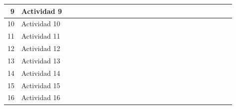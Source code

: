 \documentclass[10pt,letterpaper]{report}
\begin{document}
\begin{landscape}
\begin{table}[htbp]
{\begin{tabular}{|r|l|r|r|r|r|r|r|r|r|r|r|r|r|r|r|r|r|r|r|r|r|r|r|r|r|}
			\midrule
			9     & Actividad 9 &       &       &       &       &       &       &       &       &       &       &       &       &       &       &       &       &       &       &       &       &       &       &       &  \\
			\midrule
			10    & Actividad 10 &       &       &       &       &       & \cellcolor[rgb]{ .557,  .663,  .859} & \cellcolor[rgb]{ .557,  .663,  .859} & \cellcolor[rgb]{ .557,  .663,  .859} & \cellcolor[rgb]{ .557,  .663,  .859} &       &       &       &       &       &       &       &       &       &       &       &       &       &       &  \\
			\midrule
			11    & Actividad 11 &       &       &       &       &       &       &       &       &       &       & \cellcolor[rgb]{ .557,  .663,  .859} & \cellcolor[rgb]{ .557,  .663,  .859} & \cellcolor[rgb]{ .557,  .663,  .859} & \cellcolor[rgb]{ .557,  .663,  .859} &       &       &       &       &       &       &       &       &       &  \\
			\midrule
			12    & Actividad 12 &       &       &       &       &       &       &       &       &       &       &       &       &       &       &       &       &       &       &       &       &       &       &       &  \\
			\midrule
			13    & Actividad 13 &       &       &       &       &       &       &       &       &       &       &       &       &       &       & \cellcolor[rgb]{ .557,  .663,  .859} & \cellcolor[rgb]{ .557,  .663,  .859} & \cellcolor[rgb]{ .557,  .663,  .859} & \cellcolor[rgb]{ .557,  .663,  .859} & \cellcolor[rgb]{ .557,  .663,  .859} &       &       &       &       &  \\
			\midrule
			14    & Actividad 14 &       &       &       &       &       &       &       &       &       &       &       &       &       &       &       &       &       &       &       & \cellcolor[rgb]{ .557,  .663,  .859} & \cellcolor[rgb]{ .557,  .663,  .859} & \cellcolor[rgb]{ .557,  .663,  .859} & \cellcolor[rgb]{ .557,  .663,  .859} &  \\
			\midrule
			15    & Actividad 15 &       &       &       &       &       &       &       &       &       &       &       &       &       &       &       &       &       &       &       &       &       & \cellcolor[rgb]{ .557,  .663,  .859} & \cellcolor[rgb]{ .557,  .663,  .859} & \cellcolor[rgb]{ .557,  .663,  .859} \\
			\midrule
			16    & Actividad 16 &       &       &       &       &       &       &       &       &       &       &       &       &       &       &       &       &       &       &       &       &       & \cellcolor[rgb]{ .557,  .663,  .859} & \cellcolor[rgb]{ .557,  .663,  .859} & \cellcolor[rgb]{ .557,  .663,  .859} \\
			\bottomrule
	\end{tabular}}%
	\label{tab:tab2}%
\end{table}%


\end{landscape}
\end{document}
